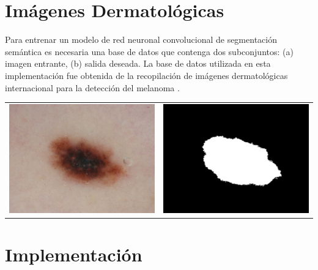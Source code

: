 \documentclass[a0,portrait]{a0poster}
\begin{document}
\begin{multicols}{3}
\section*{Imágenes Dermatológicas}
Para entrenar un modelo de red neuronal convolucional de segmentación semántica es necesaria una base de datos que contenga dos subconjuntos: (a) imagen entrante, (b) salida deseada. La base de datos utilizada en esta implementación fue obtenida de la recopilación de imágenes dermatológicas internacional para la detección del melanoma \citep{isic_skin}.

\begin{center}
    \begin{tabular}{c c}
    \includegraphics{input_1.png} &
    \includegraphics{mask_1.png} \\         
    \end{tabular}
\end{center}

\vspace{2cm}


\section*{Implementación}


\end{multicols}
\end{document}

